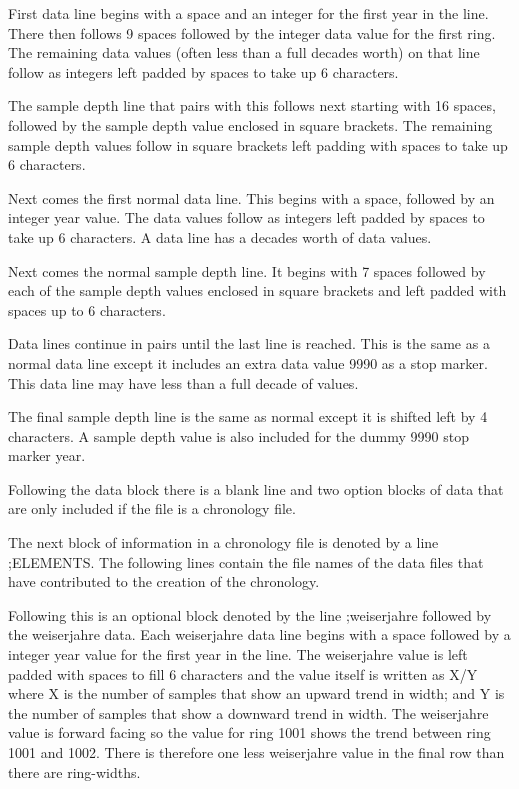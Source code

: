 \begin{itemize*}
 \item First data line begins with a space and an integer for the first year in the line. There then follows 9 spaces followed by the integer data value for the first ring. The remaining data values (often less than a full decades worth) on that line follow as integers left padded by spaces to take up 6 characters.
\item  The sample depth line that pairs with this follows next starting with 16 spaces, followed by the sample depth value enclosed in square brackets. The remaining sample depth values follow in square brackets left padding with spaces to take up 6 characters.
\item  Next comes the first normal data line. This begins with a space, followed by an integer year value. The data values follow as integers left padded by spaces to take up 6 characters. A data line has a decades worth of data values.
\item  Next comes the normal sample depth line. It begins with 7 spaces followed by each of the sample depth values enclosed in square brackets and left padded with spaces up to 6 characters.
\item  Data lines continue in pairs until the last line is reached. This is the same as a normal data line except it includes an extra data value 9990 as a stop marker. This data line may have less than a full decade of values.
\item  The final sample depth line is the same as normal except it is shifted left by 4 characters. A sample depth value is also included for the dummy 9990 stop marker year. 
\end{itemize*}

Following the data block there is a blank line and two option blocks of data that are only included if the file is a chronology file.

The next block of information in a chronology file is denoted by a line ;ELEMENTS. The following lines contain the file names of the data files that have contributed to the creation of the chronology.

Following this is an optional block denoted by the line ;weiserjahre followed by the weiserjahre data. Each weiserjahre data line begins with a space followed by a integer year value for the first year in the line. The weiserjahre value is left padded with spaces to fill 6 characters and the value itself is written as X/Y where X is the number of samples that show an upward trend in width; and Y is the number of samples that show a downward trend in width. The weiserjahre value is forward facing so the value for ring 1001 shows the trend between ring 1001 and 1002. There is therefore one less weiserjahre value in the final row than there are ring-widths.

